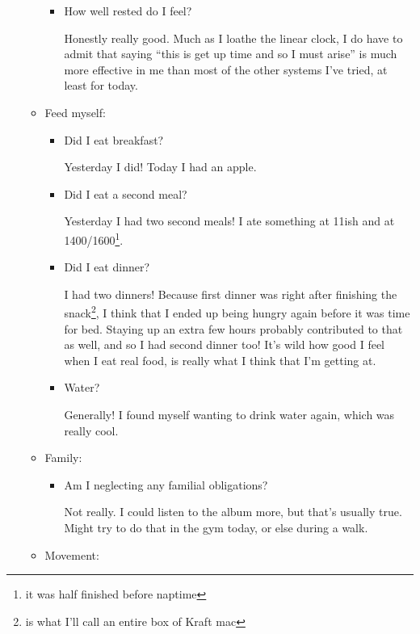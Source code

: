 \documentclass[12pt]{article}
\newcommand{\say}[1]{``#1''}
\renewcommand{\,}{\textsuperscript{,}}
\begin{document}
\begin{enumerate}
\begin{itemize}
\begin{itemize}
\item How well rested do I feel?

Honestly really good.  
Much as I loathe the linear clock, I do have to admit that saying \say{this is get up time and so I must arise} is much more effective in me than most of the other systems I've tried, at least for today.

\end{itemize}

\item Feed myself:

\begin{itemize}

\item Did I eat breakfast?

Yesterday I did! Today I had an apple.

\item Did I eat a second meal?

Yesterday I had two second meals! I ate something at 11ish and at 1400/1600\footnote{it was half finished before naptime}.

\item Did I eat dinner?

I had two dinners! Because first dinner was right after finishing the snack\footnote{is what I'll call an entire box of Kraft mac}, I think that I ended up being hungry again before it was time for bed.  
Staying up an extra few hours probably contributed to that as well, and so I had second dinner too!  
It's wild how good I feel when I eat real food, is really what I think that I'm getting at.

\item Water?

Generally! I found myself wanting to drink water again, which was really cool.

\end{itemize}

\item Family:

\begin{itemize}

\item Am I neglecting any familial obligations?

Not really. I could listen to the album more, but that's usually true. Might try to do that in the gym today, or else during a walk.

\end{itemize}

\item Movement:


\end{itemize}
\end{enumerate}
\end{document}
